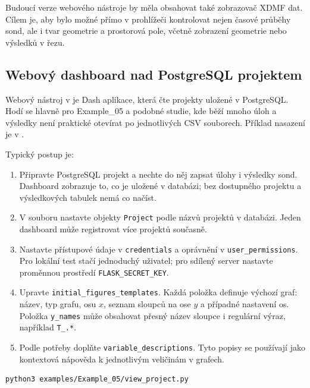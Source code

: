 \documentclass[a4paper,11pt]{article}
\begin{document}
\begin{noteblock}
Budoucí verze webového nástroje by měla obsahovat také zobrazovač XDMF dat.
Cílem je, aby bylo možné přímo v prohlížeči kontrolovat nejen časové průběhy
sond, ale i tvar geometrie a prostorová pole, včetně zobrazení geometrie nebo
výsledků v řezu.
\end{noteblock}

\subsection*{Webový dashboard nad PostgreSQL projektem}

Webový nástroj v  je Dash aplikace, která čte
projekty uložené v PostgreSQL. Hodí se hlavně pro Example\_05 a podobné studie,
kde běží mnoho úloh a výsledky není praktické otevírat po jednotlivých CSV
souborech. Příklad nasazení je v .

Typický postup je:

\begin{enumerate}
  \item Připravte PostgreSQL projekt a nechte do něj zapsat úlohy i výsledky
        sond. Dashboard zobrazuje to, co je uložené v databázi; bez dostupného
        projektu a výsledkových tabulek nemá co načíst.
  \item V souboru  nastavte objekty \texttt{Project} podle
        názvů projektů v databázi. Jeden dashboard může registrovat více
        projektů současně.
  \item Nastavte přístupové údaje v \texttt{credentials} a oprávnění v
        \texttt{user\_permissions}. Pro lokální test stačí jednoduchý uživatel;
        pro sdílený server nastavte proměnnou prostředí
        \texttt{FLASK\_SECRET\_KEY}.
  \item Upravte \texttt{initial\_figures\_templates}. Každá položka definuje
        výchozí graf: název, typ grafu, osu \(x\), seznam sloupců na ose \(y\)
        a případné nastavení os. Položka \texttt{y\_names} může obsahovat přesný
        název sloupce i regulární výraz, například \texttt{T\_.*}.
  \item Podle potřeby doplňte \texttt{variable\_descriptions}. Tyto popisy se
        používají jako kontextová nápověda k jednotlivým veličinám v grafech.
\end{enumerate}

\begin{lstlisting}[style=bash]
python3 examples/Example_05/view_project.py
\end{lstlisting}
\end{document}
